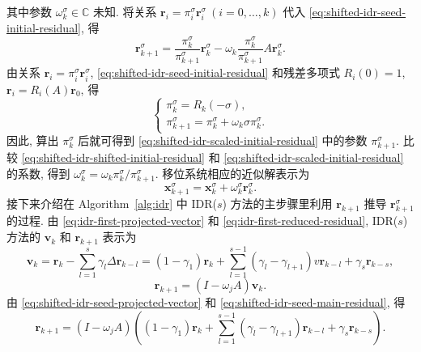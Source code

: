 {其中参数 $\omega_k^{\sigma}\in\mathbb C$ 未知. 将关系 $\bm r_i=\pi_i^{\sigma}\bm r_i^{\sigma}\ (i=0,\ldots,k)$ 代入 \eqref{eq:shifted-idr-seed-initial-residual}, 得}
\begin{equation}\label{eq:shifted-idr-scaled-initial-residual}\bm r_{k+1}^{\sigma}=\frac{\pi_k^{\sigma}}{\pi_{k+1}^{\sigma}}\bm r_k^{\sigma}-\omega_k\frac{\pi_k^{\sigma}}{\pi_{k+1}^{\sigma}}A\bm r_k^{\sigma}.\end{equation}
{由关系 $\bm r_i=\pi_i^{\sigma}\bm r_i^{\sigma}$, \eqref{eq:shifted-idr-seed-initial-residual} 和残差多项式 $R_i(0)=1$, $\bm r_i=R_i(A)\bm r_0$, 得}
\[\begin{cases}\pi_k^{\sigma}=R_k(-\sigma),\\\pi_{k+1}^{\sigma}=\pi_k^{\sigma}+\omega_k\sigma\pi_k^{\sigma}.\end{cases}\]
{因此, 算出 $\pi_k^{\sigma}$ 后就可得到 \eqref{eq:shifted-idr-scaled-initial-residual} 中的参数 $\pi_{k+1}^{\sigma}$. 比较 \eqref{eq:shifted-idr-shifted-initial-residual} 和 \eqref{eq:shifted-idr-scaled-initial-residual} 的系数, 得到 $\omega_k^{\sigma}=\omega_k\pi_k^{\sigma}/\pi_{k+1}^{\sigma}$. 移位系统相应的近似解表示为}
\begin{equation}\label{eq:shifted-idr-initial-solution}\bm x_{k+1}^{\sigma}=\bm x_k^{\sigma}+\omega_k^{\sigma}\bm r_k^{\sigma}.\end{equation}
{接下来介绍在 Algorithm\ \ref{alg:idr} 中 IDR($s$) 方法的主步骤里利用 $\bm r_{k+1}$ 推导 $\bm r_{k+1}^{\sigma}$ 的过程. 由 \eqref{eq:idr-first-projected-vector} 和 \eqref{eq:idr-first-reduced-residual}, IDR($s$) 方法的 $\bm v_k$ 和 $\bm r_{k+1}$ 表示为}
\begin{equation}\label{eq:shifted-idr-seed-projected-vector}\bm v_k=\bm r_k-\sum_{l=1}^{s}\gamma_l\Delta\bm r_{k-l}=(1-\gamma_1)\bm r_k+\sum_{l=1}^{s-1}(\gamma_l-\gamma_{l+1})v\bm r_{k-l}+\gamma_s\bm r_{k-s},\end{equation}
\begin{equation}\label{eq:shifted-idr-seed-main-residual}\bm r_{k+1}=(I-\omega_jA)\bm v_k.\end{equation}
{由 \eqref{eq:shifted-idr-seed-projected-vector} 和 \eqref{eq:shifted-idr-seed-main-residual}, 得}
\begin{equation}\label{eq:shifted-idr-seed-expanded-residual}\bm r_{k+1}=(I-\omega_jA)\left((1-\gamma_1)\bm r_k+\sum_{l=1}^{s-1}(\gamma_l-\gamma_{l+1})\bm r_{k-l}+\gamma_s\bm r_{k-s}\right).\end{equation}
